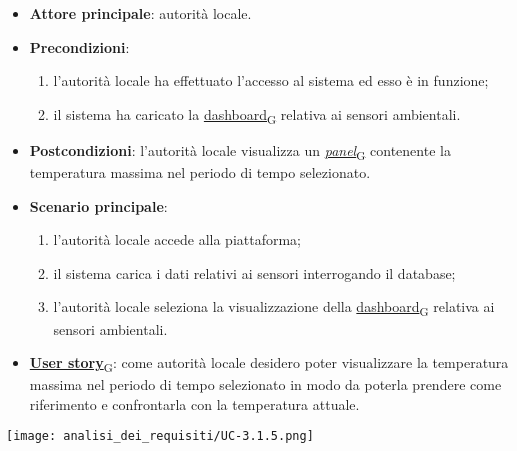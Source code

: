 \newpage
{}
\begin{itemize}
	\item \textbf{Attore principale}: autorità locale.
	\item \textbf{Precondizioni}:
	      \begin{enumerate}
		      \item l'autorità locale ha effettuato l'accesso al sistema ed esso è in funzione;
		      \item il sistema ha caricato la \href{https://7last.github.io/docs/pb/documentazione-interna/glossario\#dashboard}{dashboard\textsubscript{G}} relativa ai sensori ambientali.
	      \end{enumerate}
	\item \textbf{Postcondizioni}: l'autorità locale visualizza un \href{https://7last.github.io/docs/pb/documentazione-interna/glossario\#panel}{\textit{panel}\textsubscript{G}} contenente la temperatura massima nel periodo di tempo selezionato.
	\item \textbf{Scenario principale}:
	      \begin{enumerate}
		      \item l'autorità locale accede alla piattaforma;
		      \item il sistema carica i dati relativi ai sensori interrogando il database;
		      \item l'autorità locale seleziona la visualizzazione della \href{https://7last.github.io/docs/pb/documentazione-interna/glossario\#dashboard}{dashboard\textsubscript{G}} relativa ai sensori ambientali.
	      \end{enumerate}
	\item \href{https://7last.github.io/docs/pb/documentazione-interna/glossario\#user-story}{\textbf{User story}\textsubscript{G}}:
	      come autorità locale desidero poter visualizzare la temperatura massima nel periodo di tempo selezionato
	      in modo da poterla prendere come riferimento e confrontarla con la temperatura attuale.
\end{itemize}
\begin{center}
	\texttt{[image: analisi\_dei\_requisiti/UC-3.1.5.png]}
\end{center}

